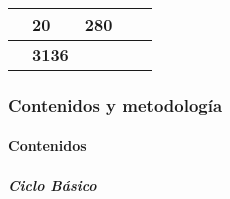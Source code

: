 \documentclass[a4paper, 12pt]{article}
\begin{document}
\begin{center}
\begin{xltabular}{1\textwidth}{|>{\raggedleft\arraybackslash}X |
>{\raggedleft\arraybackslash}X |
>{\raggedright\arraybackslash} p{5cm}|
>{\raggedleft\arraybackslash}X |
>{\raggedleft\arraybackslash}X |}
             & \textbf{20}          &\textbf{280}         \\ \hline
{}                               &\textbf{3136}         \\ \hline
\end{xltabular}
\end{center}
\normalsize


\subsubsection{Contenidos y metodología}
\paragraph{Contenidos}
\subparagraph{Ciclo Básico}
\end{document}
